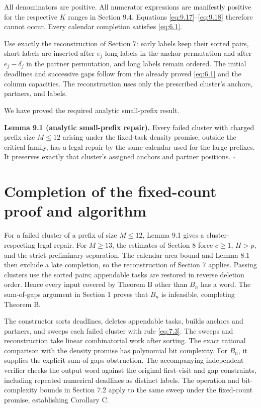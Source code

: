 \documentclass[11pt,a4paper]{article}
\begin{document}
All denominators are positive. All numerator expressions are manifestly positive for the respective \(K\) ranges in Section 9.4. Equations \eqref{eq:9.17}--\eqref{eq:9.18} therefore cannot occur. Every calendar completion satisfies \eqref{eq:6.1}.

Use exactly the reconstruction of Section 7: early labels keep their sorted pairs, short labels are inserted after \(e_j\) long labels in the anchor permutation and after \(e_j-\delta_j\) in the partner permutation, and long labels remain ordered. The initial deadlines and successive gaps follow from the already proved \eqref{eq:6.1} and the column capacities. The reconstruction uses only the prescribed cluster's anchors, partners, and labels.

We have proved the required analytic small-prefix result.

\textbf{Lemma 9.1 (analytic small-prefix repair).} Every failed cluster with charged prefix size \(M\le 12\) arising under the fixed-task density promise, outside the critical family, has a legal repair by the same calendar used for the large prefixes. It preserves exactly that cluster's assigned anchors and partner positions. \(\square\)

\hypertarget{completion-of-the-fixed-count-proof-and-algorithm}{%
\section{Completion of the fixed-count proof and algorithm}\label{completion-of-the-fixed-count-proof-and-algorithm}}

For a failed cluster of a prefix of size \(M\le12\), Lemma 9.1 gives a cluster-respecting legal repair. For \(M\ge13\), the estimates of Section 8 force \(c\ge1\), \(H>p\), and the strict preliminary separation. The calendar area bound and Lemma 8.1 then exclude a late completion, so the reconstruction of Section 7 applies. Passing clusters use the sorted pairs; appendable tasks are restored in reverse deletion order. Hence every input covered by Theorem B other than \(B_n\) has a word. The sum-of-gaps argument in Section 1 proves that \(B_n\) is infeasible, completing Theorem B.

The constructor sorts deadlines, deletes appendable tasks, builds anchors and partners, and sweeps each failed cluster with rule \eqref{eq:7.3}. The sweeps and reconstruction take linear combinatorial work after sorting. The exact rational comparison with the density promise has polynomial bit complexity. For \(B_n\), it supplies the explicit sum-of-gaps obstruction. The accompanying independent verifier checks the output word against the original first-visit and gap constraints, including repeated numerical deadlines as distinct labels. The operation and bit-complexity bounds in Section 7.2 apply to the same sweep under the fixed-count promise, establishing Corollary C.
\end{document}
